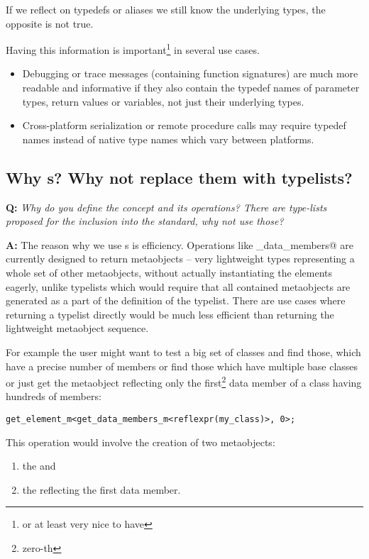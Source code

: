 If we reflect on typedefs or aliases we still know the underlying types,
the opposite is not true.  

Having this information is important\footnote{or at least very nice to have}
in several use cases.

\begin{itemize}
	\item Debugging or trace messages (containing function signatures)
		are much more readable and informative if they also contain 
		the typedef names of parameter types, return values or variables,
		not just their underlying types.
	\item Cross-platform serialization or remote procedure calls may require
		typedef names instead of native type names which vary between
		platforms.
\end{itemize}


\subsection{Why s? Why not replace them with typelists?}

\textbf{Q:} {\em Why do you define the  concept and its
operations? There are type-lists proposed for the inclusion into the standard,
why not use those?}

\textbf{A:} The reason why we use s is efficiency.
Operations like \verb@get_data_members@ are currently designed to return
metaobjects --  very lightweight types representing a whole set of
other metaobjects, without actually instantiating the elements eagerly,
unlike typelists which would require that all contained
metaobjects are generated as a part of the definition of the typelist.
There are use cases where returning a typelist directly would be much
less efficient than returning the lightweight metaobject sequence.

For example the user might want to test a big set of classes and find those,
which have a precise number of members or find those which have multiple base
classes or just get the metaobject reflecting only the first\footnote
{zero-th} data member of a class having hundreds of members:

\begin{verbatim}
get_element_m<get_data_members_m<reflexpr(my_class)>, 0>;
\end{verbatim}

This operation would involve the creation of two metaobjects:
\begin{enumerate}
	\item the  and
	\item the  reflecting the first data member.
\end{enumerate}

